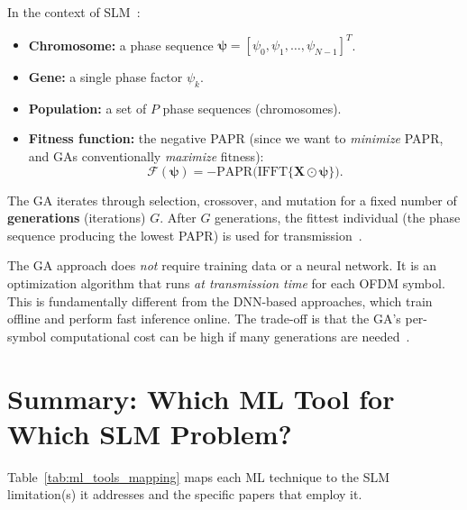 In the context of SLM~\cite{ali2016new}:
\begin{itemize}
    \item \textbf{Chromosome:} a phase sequence
          $\bm{\psi} = [\psi_0, \psi_1, \dots, \psi_{N-1}]^T$.
    \item \textbf{Gene:} a single phase factor $\psi_k$.
    \item \textbf{Population:} a set of $P$ phase sequences (chromosomes).
    \item \textbf{Fitness function:} the negative PAPR (since we want to
          \emph{minimize} PAPR, and GAs conventionally \emph{maximize}
          fitness):
          \begin{equation}
              \mathcal{F}(\bm{\psi}) = -\mathrm{PAPR}\bigl(\mathrm{IFFT}\{\bm{X} \odot \bm{\psi}\}\bigr).
              \label{eq:ga_fitness}
          \end{equation}
\end{itemize}

The GA iterates through selection, crossover, and mutation for a fixed
number of \textbf{generations} (iterations) $G$.  After $G$ generations,
the fittest individual (the phase sequence producing the lowest PAPR)
is used for transmission~\cite{ali2016new}.

\begin{keyinsight}
    The GA approach does \emph{not} require training data or a neural
    network.  It is an optimization algorithm that runs \emph{at
    transmission time} for each OFDM symbol.  This is fundamentally
    different from the DNN-based approaches, which train offline and
    perform fast inference online.  The trade-off is that the GA's
    per-symbol computational cost can be high if many generations
    are needed~\cite{ali2016new}.
\end{keyinsight}


\section{Summary: Which ML Tool for Which SLM Problem?}
\label{sec:ml_summary}

Table~\ref{tab:ml_tools_mapping} maps each ML technique to the SLM
limitation(s) it addresses and the specific papers that employ it.

